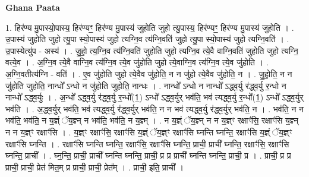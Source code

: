 \documentclass[17pt]{extarticle}
\begin{document}
\textbf{Ghana Paata } \newline

1. हिर॑ण्य मु॒पास्यो॒पास्य॒ हिर॑ण्यꣳ॒॒ हिर॑ण्य मु॒पास्य॑ जुहोति जुहो त्यु॒पास्य॒ हिर॑ण्यꣳ॒॒ हिर॑ण्य मु॒पास्य॑ जुहोति । . उ॒पास्य॑ जुहोति जुहो त्यु॒पा स्यो॒पास्य॑ जुहो त्यग्नि॒व त्य॑ग्नि॒वति॑ जुहो त्यु॒पा स्यो॒पास्य॑ जुहो त्यग्नि॒वति॑ । . उ॒पास्येत्यु॑प - अस्य॑ । . जु॒हो॒ त्य॒ग्नि॒व त्य॑ग्नि॒वति॑ जुहोति जुहो त्यग्नि॒व त्ये॒वै वाग्नि॒वति॑ जुहोति जुहो त्यग्नि॒ वत्ये॒व । . अ॒ग्नि॒व त्ये॒वै वाग्नि॒व त्य॑ग्नि॒व त्ये॒व जु॑होति जुहो त्ये॒वाग्नि॒व त्य॑ग्नि॒व त्ये॒व जु॑होति । . अ॒ग्नि॒वतीत्य॑ग्नि - वति॑ । . ए॒व जु॑होति जुहो त्ये॒वैव जु॑होति॒ न न जु॑हो त्ये॒वैव जु॑होति॒ न । . जु॒हो॒ति॒ न न जु॑होति जुहोति॒ नान्धो᳚ ऽन्धो न जु॑होति जुहोति॒ नान्धः । . नान्धो᳚ ऽन्धो न नान्धो᳚ ऽद्ध्व॒र्यु र॑द्ध्व॒र्यु र॒न्धो न नान्धो᳚ ऽद्ध्व॒र्युः । . अ॒न्धो᳚ ऽद्ध्व॒र्यु र॑द्ध्व॒र्यु र॒न्धो᳚(1॒) ऽन्धो᳚ ऽद्ध्व॒र्युर् भव॑ति॒ भव॑ त्यद्ध्व॒र्यु र॒न्धो᳚(1॒) ऽन्धो᳚ ऽद्ध्व॒र्युर् भव॑ति । . अ॒द्ध्व॒र्युर् भव॑ति॒ भव॑ त्यद्ध्व॒र्यु र॑द्ध्व॒र्युर् भव॑ति॒ न न भव॑ त्यद्ध्व॒र्यु र॑द्ध्व॒र्युर् भव॑ति॒ न । . भव॑ति॒ न न भव॑ति॒ भव॑ति॒ न य॒ज्ञ्ं ॅय॒ज्ञ्न् न भव॑ति॒ भव॑ति॒ न य॒ज्ञ्म् । . न य॒ज्ञ्ं ॅय॒ज्ञ्न् न न य॒ज्ञ्ꣳ रक्षाꣳ॑सि॒ रक्षाꣳ॑सि य॒ज्ञ्न् न न य॒ज्ञ्ꣳ रक्षाꣳ॑सि । . य॒ज्ञ्ꣳ रक्षाꣳ॑सि॒ रक्षाꣳ॑सि य॒ज्ञ्ं ॅय॒ज्ञ्ꣳ रक्षाꣳ॑सि घ्नन्ति घ्नन्ति॒ रक्षाꣳ॑सि य॒ज्ञ्ं ॅय॒ज्ञ्ꣳ रक्षाꣳ॑सि घ्नन्ति । . रक्षाꣳ॑सि घ्नन्ति घ्नन्ति॒ रक्षाꣳ॑सि॒ रक्षाꣳ॑सि घ्नन्ति॒ प्राची॒ प्राची᳚ घ्नन्ति॒ रक्षाꣳ॑सि॒ रक्षाꣳ॑सि घ्नन्ति॒ प्राची᳚ । . घ्न॒न्ति॒ प्राची॒ प्राची᳚ घ्नन्ति घ्नन्ति॒ प्राची॒ प्र प्र प्राची᳚ घ्नन्ति घ्नन्ति॒ प्राची॒ प्र । . प्राची॒ प्र प्र प्राची॒ प्राची॒ प्रेत॑ मित॒म् प्र प्राची॒ प्राची॒ प्रेत᳚म् । . प्राची॒ इति॒ प्राची᳚ । \newline
\end{document}
